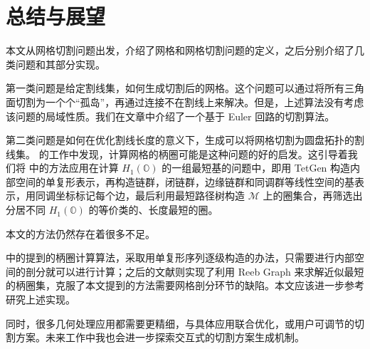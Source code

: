 
\chapter{总结与展望}

本文从网格切割问题出发，介绍了网格和网格切割问题的定义，之后分别介绍了几类问题和其部分实现。

第一类问题是给定割线集，如何生成切割后的网格。这个问题可以通过将所有三角面切割为一个个“孤岛”，再通过连接不在割线上来解决。但是，上述算法没有考虑该问题的局域性质。我们在文章中介绍了一个基于 Euler 回路的切割算法。

第二类问题是如何在优化割线长度的意义下，生成可以将网格切割为圆盘拓扑的割线集。\citet{Chai2018} 的工作中发现，计算网格的柄圈可能是这种问题的好的启发。这引导着我们将 \citet{Busaryev2012} 中的方法应用在计算 $ H_1(\mathbb{O}) $ 的一组最短基的问题中，即用 TetGen 构造内部空间的单复形表示，再构造链群，闭链群，边缘链群和同调群等线性空间的基表示，用同调坐标标记每个边，最后利用最短路径树构造 $ \mathcal{M} $ 上的圈集合，再筛选出分居不同 $ H_1(\mathbb{O}) $ 的等价类的、长度最短的圈。

本文的方法仍然存在着很多不足。

\citet{Dey2008} 中的提到的柄圈计算算法，采取用单复形序列逐级构造的办法，只需要进行内部空间的剖分就可以进行计算；之后的文献\cite{Dey2013}则实现了利用 Reeb Graph 来求解近似最短的柄圈集，克服了本文提到的方法需要网格剖分环节的缺陷。本文应该进一步参考研究上述实现。

同时，很多几何处理应用都需要更精细，与具体应用联合优化，或用户可调节的切割方案。未来工作中我也会进一步探索交互式的切割方案生成机制。